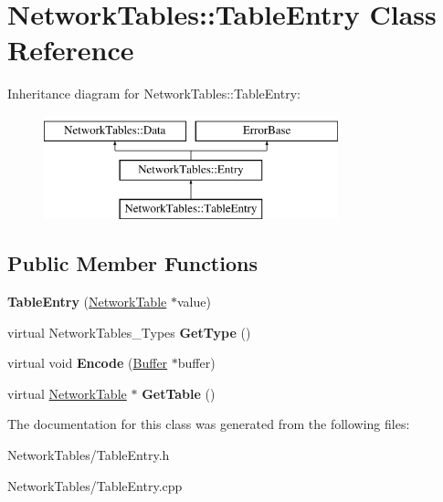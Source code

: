 \hypertarget{classNetworkTables_1_1TableEntry}{
\section{NetworkTables::TableEntry Class Reference}
\label{classNetworkTables_1_1TableEntry}
}
Inheritance diagram for NetworkTables::TableEntry:\begin{figure}[H]
\begin{center}
\leavevmode
\includegraphics[height=3.000000cm]{classNetworkTables_1_1TableEntry}
\end{center}
\end{figure}
\subsection*{Public Member Functions}
\begin{DoxyCompactItemize}
\item 
\hypertarget{classNetworkTables_1_1TableEntry_a1db089c6fdfeace7813e84c97d1aba85}{
{\bfseries TableEntry} (\hyperlink{classNetworkTable}{NetworkTable} $\ast$value)}
\label{classNetworkTables_1_1TableEntry_a1db089c6fdfeace7813e84c97d1aba85}

\item 
\hypertarget{classNetworkTables_1_1TableEntry_a26b64ac5ff04610b960b4d27120005da}{
virtual NetworkTables\_\-Types {\bfseries GetType} ()}
\label{classNetworkTables_1_1TableEntry_a26b64ac5ff04610b960b4d27120005da}

\item 
\hypertarget{classNetworkTables_1_1TableEntry_a7d516e5726006df764b2fc4f74a11992}{
virtual void {\bfseries Encode} (\hyperlink{classNetworkTables_1_1Buffer}{Buffer} $\ast$buffer)}
\label{classNetworkTables_1_1TableEntry_a7d516e5726006df764b2fc4f74a11992}

\item 
\hypertarget{classNetworkTables_1_1TableEntry_aba8ff754e6dcd4b0fc7f18b1c9829adc}{
virtual \hyperlink{classNetworkTable}{NetworkTable} $\ast$ {\bfseries GetTable} ()}
\label{classNetworkTables_1_1TableEntry_aba8ff754e6dcd4b0fc7f18b1c9829adc}

\end{DoxyCompactItemize}


The documentation for this class was generated from the following files:\begin{DoxyCompactItemize}
\item 
NetworkTables/TableEntry.h\item 
NetworkTables/TableEntry.cpp\end{DoxyCompactItemize}
